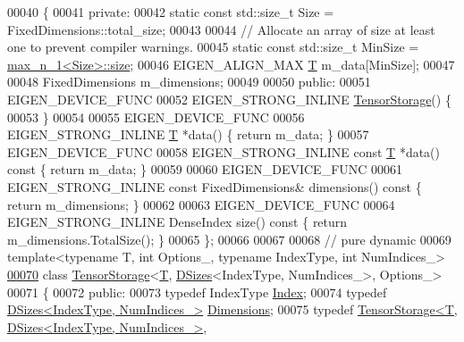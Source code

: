 \begin{DoxyCode}
00040 \{
00041  \textcolor{keyword}{private}:
00042   \textcolor{keyword}{static} \textcolor{keyword}{const} std::size\_t Size = FixedDimensions::total\_size;
00043 
00044   \textcolor{comment}{// Allocate an array of size at least one to prevent compiler warnings.}
00045   \textcolor{keyword}{static} \textcolor{keyword}{const} std::size\_t MinSize = \hyperlink{struct_eigen_1_1max__n__1}{max\_n\_1<Size>::size};
00046   EIGEN\_ALIGN\_MAX \hyperlink{group___sparse_core___module}{T} m\_data[MinSize];
00047 
00048   FixedDimensions m\_dimensions;
00049 
00050  \textcolor{keyword}{public}:
00051   EIGEN\_DEVICE\_FUNC
00052   EIGEN\_STRONG\_INLINE \hyperlink{class_eigen_1_1_tensor_storage}{TensorStorage}() \{
00053   \}
00054 
00055   EIGEN\_DEVICE\_FUNC
00056   EIGEN\_STRONG\_INLINE \hyperlink{group___sparse_core___module}{T} *data() \{ \textcolor{keywordflow}{return} m\_data; \}
00057   EIGEN\_DEVICE\_FUNC
00058   EIGEN\_STRONG\_INLINE \textcolor{keyword}{const} \hyperlink{group___sparse_core___module}{T} *data()\textcolor{keyword}{ const }\{ \textcolor{keywordflow}{return} m\_data; \}
00059 
00060   EIGEN\_DEVICE\_FUNC
00061   EIGEN\_STRONG\_INLINE \textcolor{keyword}{const} FixedDimensions& dimensions()\textcolor{keyword}{ const }\{ \textcolor{keywordflow}{return} m\_dimensions; \}
00062 
00063   EIGEN\_DEVICE\_FUNC
00064   EIGEN\_STRONG\_INLINE DenseIndex size()\textcolor{keyword}{ const }\{ \textcolor{keywordflow}{return} m\_dimensions.TotalSize(); \}
00065 \};
00066 
00067 
00068 \textcolor{comment}{// pure dynamic}
00069 \textcolor{keyword}{template}<\textcolor{keyword}{typename} T, \textcolor{keywordtype}{int} Options\_, \textcolor{keyword}{typename} IndexType, \textcolor{keywordtype}{int} NumIndices\_>
\hyperlink{class_eigen_1_1_tensor_storage_3_01_t_00_01_d_sizes_3_01_index_type_00_01_num_indices___01_4_00_01_options___01_4}{00070} \textcolor{keyword}{class }\hyperlink{class_eigen_1_1_tensor_storage}{TensorStorage}<\hyperlink{group___sparse_core___module}{T}, \hyperlink{struct_eigen_1_1_d_sizes}{DSizes}<IndexType, NumIndices\_>, Options\_>
00071 \{
00072   \textcolor{keyword}{public}:
00073     \textcolor{keyword}{typedef} IndexType \hyperlink{namespace_eigen_a62e77e0933482dafde8fe197d9a2cfde}{Index};
00074     \textcolor{keyword}{typedef} \hyperlink{struct_eigen_1_1_d_sizes}{DSizes<IndexType, NumIndices\_>} 
      \hyperlink{struct_eigen_1_1_d_sizes}{Dimensions};
00075     \textcolor{keyword}{typedef} \hyperlink{class_eigen_1_1_tensor_storage}{TensorStorage<T, DSizes<IndexType, NumIndices\_>},

\end{DoxyCode}
